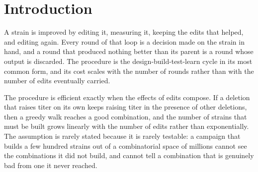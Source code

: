 
\section{Introduction}

A strain is improved by editing it, measuring it, keeping the edits that helped, and
editing again. Every round of that loop is a decision made on the strain in hand, and a
round that produced nothing better than its parent is a round whose output is discarded.
The procedure is the design-build-test-learn cycle in its most common form, and its cost
scales with the number of rounds rather than with the number of edits eventually carried.

The procedure is efficient exactly when the effects of edits compose. If a deletion that
raises titer on its own keeps raising titer in the presence of other deletions, then a
greedy walk reaches a good combination, and the number of strains that must be built grows
linearly with the number of edits rather than exponentially. The assumption is rarely
stated because it is rarely testable: a campaign that builds a few hundred strains out of a
combinatorial space of millions cannot see the combinations it did not build, and cannot
tell a combination that is genuinely bad from one it never reached.

